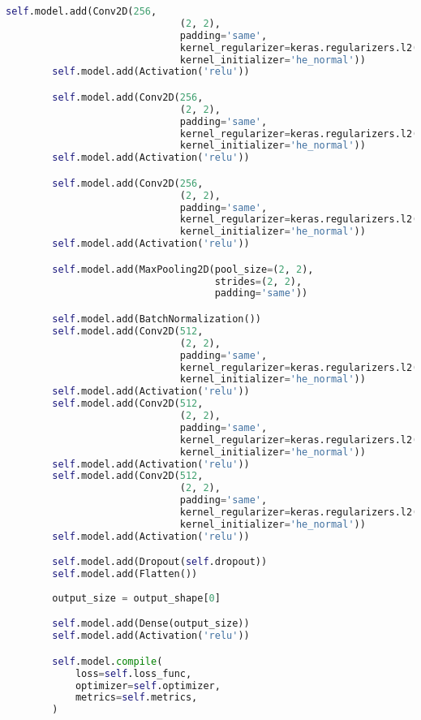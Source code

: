 \begin{appendices}
\begin{lstlisting}[language=python]
        self.model.add(Conv2D(256,
                              (2, 2),
                              padding='same',
                              kernel_regularizer=keras.regularizers.l2(self.weight_decay),
                              kernel_initializer='he_normal'))
        self.model.add(Activation('relu'))

        self.model.add(Conv2D(256,
                              (2, 2),
                              padding='same',
                              kernel_regularizer=keras.regularizers.l2(self.weight_decay),
                              kernel_initializer='he_normal'))
        self.model.add(Activation('relu'))

        self.model.add(Conv2D(256,
                              (2, 2),
                              padding='same',
                              kernel_regularizer=keras.regularizers.l2(self.weight_decay),
                              kernel_initializer='he_normal'))
        self.model.add(Activation('relu'))

        self.model.add(MaxPooling2D(pool_size=(2, 2),
                                    strides=(2, 2),
                                    padding='same'))

        self.model.add(BatchNormalization())
        self.model.add(Conv2D(512,
                              (2, 2),
                              padding='same',
                              kernel_regularizer=keras.regularizers.l2(self.weight_decay),
                              kernel_initializer='he_normal'))
        self.model.add(Activation('relu'))
        self.model.add(Conv2D(512,
                              (2, 2),
                              padding='same',
                              kernel_regularizer=keras.regularizers.l2(self.weight_decay),
                              kernel_initializer='he_normal'))
        self.model.add(Activation('relu'))
        self.model.add(Conv2D(512,
                              (2, 2),
                              padding='same',
                              kernel_regularizer=keras.regularizers.l2(self.weight_decay),
                              kernel_initializer='he_normal'))
        self.model.add(Activation('relu'))

        self.model.add(Dropout(self.dropout))
        self.model.add(Flatten())
        
        output_size = output_shape[0]

        self.model.add(Dense(output_size))
        self.model.add(Activation('relu'))

        self.model.compile(
            loss=self.loss_func,
            optimizer=self.optimizer,
            metrics=self.metrics,
        )
\end{lstlisting}
    
\end{appendices}